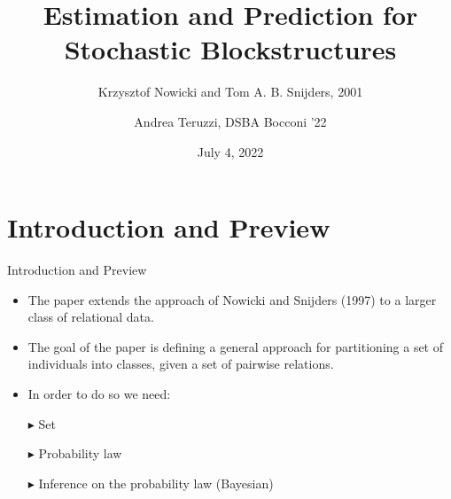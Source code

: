 \documentclass[aspectratio=169,xcolor=dvipsnames]{beamer}
\title[Nowicki and Snijders '01]{Estimation and Prediction for Stochastic Blockstructures} \subtitle{Krzysztof Nowicki and Tom A. B. Snijders, 2001}
\author[Andrea Teruzzi] {Andrea Teruzzi, DSBA Bocconi '22}
\date{July 4, 2022}
\begin{document}
\begin{frame}
    \titlepage
\end{frame}



\section{Introduction and Preview}
\begin{frame}{Introduction and Preview}
\begin{itemize}
    \item The paper extends the approach of Nowicki and Snijders (1997) to a larger class of relational data.
    \pause
    \item The goal of the paper is defining a general approach for partitioning a set of individuals into classes, given a set of pairwise relations.
    \pause
    \item In order to do so we need:
        \pause
        \addtolength{\itemindent}{12pt}
        \pause
        \item[$\blacktriangleright$] Set
        \pause
        \item[$\blacktriangleright$] Probability law
        \pause
        \item[$\blacktriangleright$] Inference on the probability law (Bayesian)
\end{itemize}
\end{frame}

\end{document}

